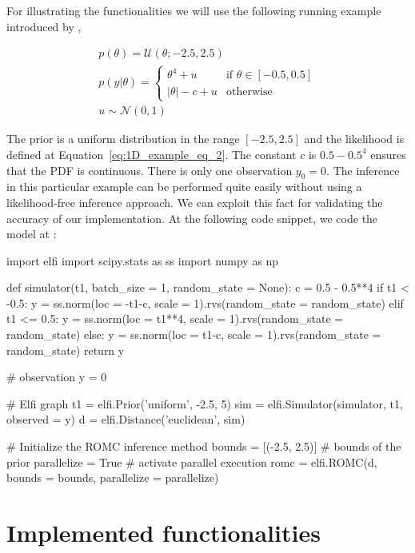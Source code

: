 \documentclass[article]{jss}
\begin{document}
For illustrating the functionalities we will use the following running
example introduced by \citet{Ikonomov2019},

\begin{gather} \label{eq:1D_example}
  p(\theta) = \mathcal{U}(\theta;-2.5,2.5)\\ \label{eq:1D_example_eq_2}
  p(y|\theta) = \left\{
    \begin{array}{ll} \theta^4 + u & \mbox{if } \theta \in [-0.5, 0.5]
\\ |\theta| - c + u & \mbox{otherwise}
    \end{array} \right.\\
  u \sim \mathcal{N}(0,1)
\end{gather}

\noindent

The prior is a uniform distribution in the range \([-2.5, 2.5]\) and
the likelihood is defined at Equation~\ref{eq:1D_example_eq_2}. The
constant \(c\) is \(0.5 - 0.5^4\) ensures that the PDF is
continuous. There is only one observation \(y_0 = 0\). The inference
in this particular example can be performed quite easily without using
a likelihood-free inference approach. We can exploit this fact for
validating the accuracy of our implementation. At the following code
snippet, we code the model at :

\begin{Code}
import elfi
import scipy.stats as ss
import numpy as np

def simulator(t1, batch_size = 1, random_state = None):
    c = 0.5 - 0.5**4
    if t1 < -0.5:
        y = ss.norm(loc = -t1-c, scale = 1).rvs(random_state = random_state)
    elif t1 <= 0.5:
        y = ss.norm(loc = t1**4, scale = 1).rvs(random_state = random_state)
    else:
        y = ss.norm(loc = t1-c, scale = 1).rvs(random_state = random_state)
    return y

# observation
y = 0

# Elfi graph
t1 = elfi.Prior('uniform', -2.5, 5)
sim = elfi.Simulator(simulator, t1, observed = y)
d = elfi.Distance('euclidean', sim)

# Initialize the ROMC inference method
bounds = [(-2.5, 2.5)] # bounds of the prior
parallelize = True # activate parallel execution
romc = elfi.ROMC(d, bounds = bounds, parallelize = parallelize)
\end{Code}


\section{Implemented functionalities}
\end{document}
